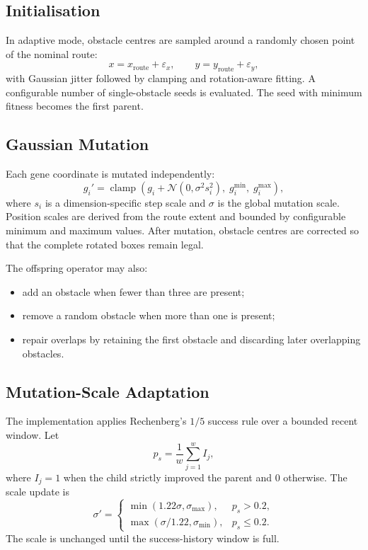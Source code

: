 \documentclass[11pt,a4paper,openany]{report}
\begin{document}
\subsection{Initialisation}
In adaptive mode, obstacle centres are sampled around a randomly chosen point of the nominal route:
\[
x=x_{\mathrm{route}}+\varepsilon_x,\qquad
 y=y_{\mathrm{route}}+\varepsilon_y,
\]
with Gaussian jitter followed by clamping and rotation-aware fitting. A configurable number of single-obstacle seeds is evaluated. The seed with minimum fitness becomes the first parent.

\subsection{Gaussian Mutation}
Each gene coordinate is mutated independently:
\[
g_i'=\operatorname{clamp}\left(g_i+\mathcal{N}\left(0,\sigma^2 s_i^2\right),\;g_i^{\min},\;g_i^{\max}\right),
\]
where $s_i$ is a dimension-specific step scale and $\sigma$ is the global mutation scale. Position scales are derived from the route extent and bounded by configurable minimum and maximum values. After mutation, obstacle centres are corrected so that the complete rotated boxes remain legal.

The offspring operator may also:
\begin{itemize}
  \item add an obstacle when fewer than three are present;
  \item remove a random obstacle when more than one is present;
  \item repair overlaps by retaining the first obstacle and discarding later overlapping obstacles.
\end{itemize}

\subsection{Mutation-Scale Adaptation}
The implementation applies Rechenberg's $1/5$ success rule over a bounded recent window. Let
\[
p_s=\frac{1}{w}\sum_{j=1}^{w} I_j,
\]
where $I_j=1$ when the child strictly improved the parent and $0$ otherwise. The scale update is
\[
\sigma'=
\begin{cases}
\min(1.22\sigma,\sigma_{\max}), & p_s>0.2,\\[2mm]
\max(\sigma/1.22,\sigma_{\min}), & p_s\le 0.2.
\end{cases}
\]
The scale is unchanged until the success-history window is full.
\end{document}
